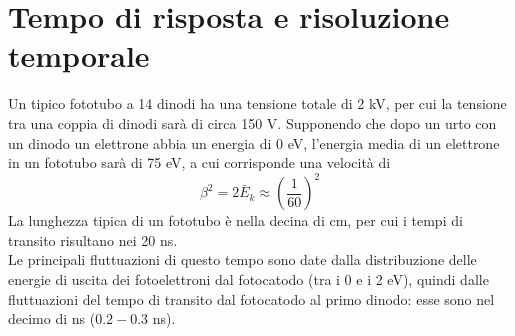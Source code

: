 \section{Tempo di risposta e risoluzione temporale}
Un tipico fototubo a 14 dinodi ha una tensione totale di 2 kV, per cui la tensione tra una coppia di dinodi sar\`a di circa 150 V.
Supponendo che dopo un urto con un dinodo un elettrone abbia un energia di 0 eV, l'energia media di un elettrone in un fototubo sar\`a di 75 eV,
a cui corrisponde una velocit\`a di
\begin{equation*}
\beta^2  = 2 \bar{E}_k \approx \left(\frac{1}{60}\right)^2 
\end{equation*}
La lunghezza tipica di un fototubo \`e nella decina di cm, per cui i tempi di transito risultano nei 20 ns.\\
Le principali fluttuazioni di questo tempo sono date dalla distribuzione delle energie di uscita dei fotoelettroni dal fotocatodo (tra i 0 e i 2 eV),
quindi dalle fluttuazioni del tempo di transito dal fotocatodo al primo dinodo: esse sono nel decimo di ns ($0.2 - 0.3$ ns).
